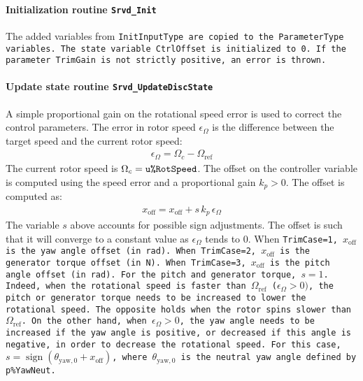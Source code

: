 \documentclass[11pt]{article}
\begin{document}
\paragraph{Initialization routine \tt{Srvd\_Init}}
The added variables from \tt{InitInputType} are copied to the \tt{ParameterType} variables.
The state variable \tt{CtrlOffset} is initialized to 0.
If the parameter \tt{TrimGain} is not strictly positive, an error is thrown.


\paragraph{Update state routine \tt{Srvd\_UpdateDiscState}}
A simple proportional gain on the rotational speed error is used to correct the control parameters.
The error in rotor speed $\epsilon_\Omega$ is the difference between the target speed and the current rotor speed:
        \begin{align}
            \epsilon_\Omega ={\Omega_c - \Omega_\text{ref}}
        \end{align}
The current rotor speed is $\Omega_c=\tt{u\%RotSpeed}$.
        The offset on the controller variable is computed using 
        the speed error and a proportional gain $k_p>0$. The offset is computed as:
        \begin{align}
            x_\text{off} = x_\text{off} + s\, k_p\, \epsilon_\Omega \label{eq:xoffpitch}
        \end{align}
The variable $s$ above accounts for possible sign adjustments. 
The offset is such that it will converge to a constant value as $\epsilon_\Omega$ tends to 0.
When \tt{TrimCase}=1, $x_\text{off}$ is the yaw angle offset (in rad). 
When \tt{TrimCase}=2, $x_\text{off}$ is the generator torque offset (in N). 
When \tt{TrimCase}=3, $x_\text{off}$ is the pitch angle offset (in rad). 
For the pitch and generator torque, $s=1$. Indeed, when the rotational speed is faster than $\Omega_\text{ref}$ ($\epsilon_\Omega>0)$, the  pitch or generator torque needs to be increased to lower the rotational speed. The opposite holds when the rotor spins slower than $\Omega_\text{ref}$.
On the other hand, when $\epsilon_\Omega>0$, the yaw angle needs to be increased if the yaw angle is positive, or decreased if this angle is negative, in order to decrease the rotational speed. For this case, $s=\operatorname{sign}( \theta_{\text{yaw},0}+x_\text{off})$, where $\theta_{\text{yaw},0}$ is the neutral yaw angle defined by \tt{p\%YawNeut}.
\end{document}
